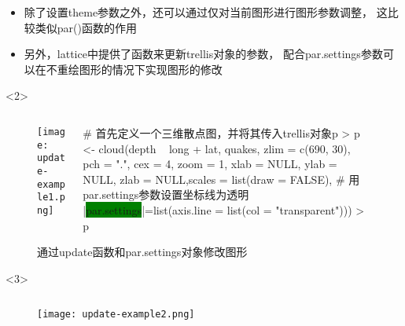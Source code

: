 \begin{frame}[t,fragile]{\subsecname}{\subsubsecname}
\begin{itemize}
\item 除了设置theme参数之外，还可以通过仅对当前图形进行图形参数调整，
这比较类似par()函数的作用
\item 另外，lattice中提供了函数来更新trellis对象的参数，
配合par.settings参数可以在不重绘图形的情况下实现图形的修改
\end{itemize}

\begin{overlayarea}{\textwidth}{\textheight}
\begin{onlyenv}<2>
\begin{figure}
 \begin{columns}
    \begin{column}[c]{.4\textwidth}
        \texttt{[image: update-example1.png]}
    \end{column}

    \begin{column}[c]{.6\textwidth}
\begin{rcode}
# 首先定义一个三维散点图，并将其传入trellis对象p
> p <-
  cloud(depth ~ long + lat, quakes, zlim = c(690, 30), pch = ".", cex = 4, zoom = 1, xlab = NULL, ylab = NULL, zlab = NULL,scales = list(draw = FALSE),
        # 用par.settings参数设置坐标线为透明
        |\colorbox{green}{par.settings}|=list(axis.line = list(col = "transparent")))
> p
\end{rcode}
    \end{column}
  \end{columns}
  \caption{通过update函数和par.settings对象修改图形}
\end{figure}
\end{onlyenv}

\vspace{-10pt}
\begin{onlyenv}<3>
\begin{figure}
 \begin{columns}
    \begin{column}[c]{.4\textwidth}
        \texttt{[image: update-example2.png]}
    \end{column}


\end{columns}
\end{figure}
\end{onlyenv}
\end{overlayarea}
\end{frame}
